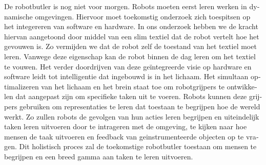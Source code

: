 \documentclass[\home/main.tex]{subfiles}
\begin{document}
\begin{otherlanguage}{dutch}
De robotbutler is nog niet voor morgen. Robots moeten eerst leren werken in dynamische omgevingen. Hiervoor moet toekomstig onderzoek zich toespitsen op het integereren van software en hardware. In ons onderzoek hebben we de kracht hiervan aangetoond door middel van een slim textiel dat de robot vertelt hoe het gevouwen is. Zo vermijden we dat de robot zelf de toestand van het textiel moet leren. Vanwege deze eigenschap kan de robot binnen de dag leren om het textiel te vouwen.
Het verder doordrijven van deze geïntegreerde visie op hardware en software leidt tot intelligentie dat ingebouwd is in het lichaam. Het simultaan optimalizeren van het lichaam en het brein staat toe om robotgrijpers te ontwikkelen dat aangepast zijn om specifieke taken uit te voeren. Robots kunnen deze grijpers gebruiken om representaties te leren dat toestaan te begrijpen hoe de wereld werkt. Zo zullen robots de gevolgen van hun acties leren begrijpen en uiteindelijk taken leren uitvoeren door te intrageren met de omgeving, te kijken naar hoe mensen de taak uitvoeren en feedback van geinstrumenteerde objecten op te vragen. 
Dit holistisch proces zal de toekomstige robotbutler toestaan om mensen te begrijpen en een breed gamma aan taken te leren uitvoeren. 

\end{otherlanguage}
\end{document}
